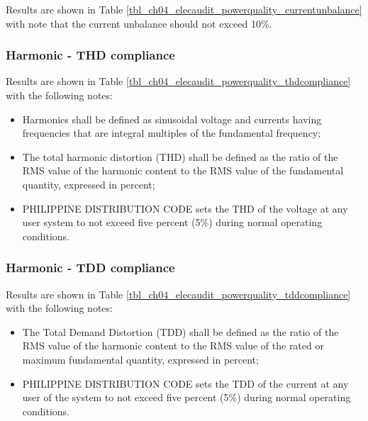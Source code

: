 Results are shown in Table \ref{tbl_ch04_elecaudit_powerquality_currentunbalance} with note that the current unbalance should not exceed 10\%.




\subsubsection{Harmonic - THD compliance}

Results are shown in Table \ref{tbl_ch04_elecaudit_powerquality_thdcompliance} with the following notes:

\begin{itemize}
	\item Harmonics shall be defined as sinusoidal voltage and currents having frequencies that are integral multiples of the fundamental frequency;
	
	\item The total harmonic distortion (THD) shall be defined as the ratio of the RMS value of the harmonic content to the RMS value of the fundamental quantity, expressed in percent;
	
	\item PHILIPPINE DISTRIBUTION CODE sets the THD of the voltage at any user system to not exceed five percent (5\%) during normal operating conditions. 
\end{itemize}





\subsubsection{Harmonic - TDD compliance}

Results are shown in Table \ref{tbl_ch04_elecaudit_powerquality_tddcompliance} with the following notes:

\begin{itemize}
	\item The Total Demand Distortion (TDD) shall be defined as the ratio of the RMS 		value of the harmonic content to the RMS value of the rated or maximum 			fundamental quantity, expressed 	in percent;
	
	\item PHILIPPINE DISTRIBUTION CODE sets the TDD of the current at any user of the system to not exceed five percent (5\%) during normal operating conditions.
	
\end{itemize}

